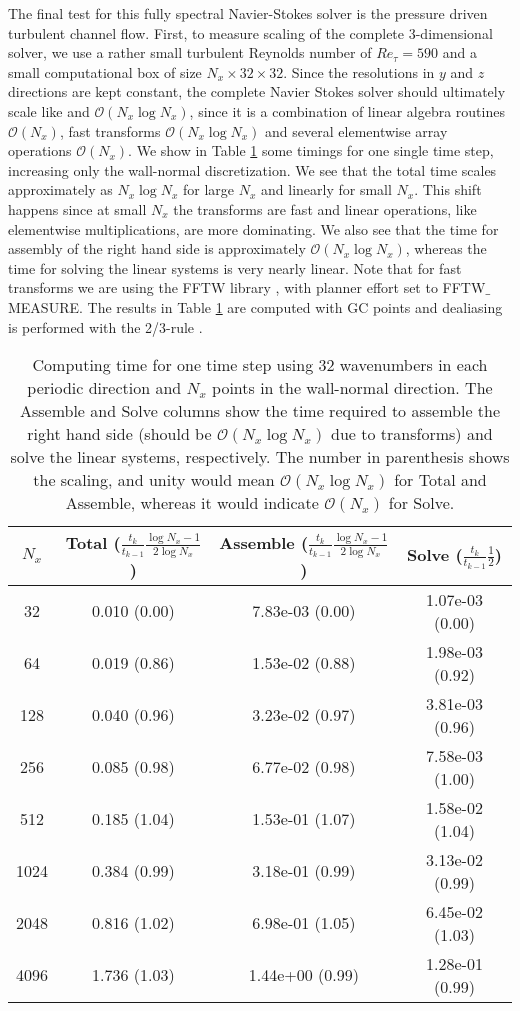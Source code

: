 \documentclass[preprint]{elsarticle}
\begin{document}
The final test for this fully spectral Navier-Stokes solver is the pressure driven turbulent channel flow. First, to measure scaling of the complete 3-dimensional solver, we use a rather small turbulent Reynolds number of $Re_{\tau}=590$ and a small computational box of size $N_x \times 32 \times 32$.  Since the resolutions in $y$ and $z$ directions are kept constant, the complete Navier Stokes solver should ultimately scale like and 
$\mathcal{O}(N_x\log N_x)$, since it is a combination of linear algebra routines 
$\mathcal{O}(N_x)$, fast transforms $\mathcal{O}(N_x \log N_x)$ and several elementwise array operations $\mathcal{O}(N_x)$. We show in Table \ref{tab:timings_solver} some timings for one single time 
step, increasing only the wall-normal discretization. We see that the total 
time scales approximately as $N_x \log N_x$ for large $N_x$ and linearly 
for small $N_x$. This shift happens since at small $N_x$ the transforms are fast and linear operations, like elementwise multiplications, are more dominating. 
We also see that the time for assembly of the right hand side is approximately 
$\mathcal{O}(N_x \log N_x)$, whereas the time for solving the linear systems is 
very nearly linear. Note that for fast transforms we are using 
the FFTW library \cite{libfftw}, with planner effort set to FFTW$\_$MEASURE. 
The results in Table \ref{tab:timings_solver} are computed with GC points and dealiasing is
performed with the 2/3-rule \cite{Orzag71}. 

\begin{table}
	\centering
	\caption{Computing time for one time step using 32 wavenumbers in each periodic direction and $N_x$ points in the wall-normal direction. The Assemble and Solve columns show the time required to assemble the right hand side (should be $\mathcal{O}(N_x \log N_x)$ due to transforms) and solve the linear systems, respectively. The number in parenthesis shows the scaling, and unity would mean $\mathcal{O}(N_x \log N_x)$ for Total and Assemble, whereas it would indicate $\mathcal{O}(N_x)$ for Solve. \label{tab:timings_solver}}
	\begin{tabular}{cccc}	
		$N_x$ & Total ($\frac{t_k }{t_{k-1}} \frac{\log N_x-1}{2 \log N_x}$) & Assemble ($\frac{t_k }{t_{k-1}} \frac{\log N_x-1}{2 \log N_x}$) & Solve ($\frac{t_k}{t_{k-1}} \frac{1}{2}$) \\ 
		\hline
		32 & 0.010 (0.00) & 7.83e-03 (0.00) & 1.07e-03 (0.00) \\ 
		64 & 0.019 (0.86) & 1.53e-02 (0.88) & 1.98e-03 (0.92) \\ 
		128 & 0.040 (0.96) & 3.23e-02 (0.97) & 3.81e-03 (0.96) \\ 
		256 & 0.085 (0.98) & 6.77e-02 (0.98) & 7.58e-03 (1.00) \\ 
		512 & 0.185 (1.04) & 1.53e-01 (1.07) & 1.58e-02 (1.04) \\ 
		1024 & 0.384 (0.99) & 3.18e-01 (0.99) & 3.13e-02 (0.99) \\ 
		2048 & 0.816 (1.02) & 6.98e-01 (1.05) & 6.45e-02 (1.03) \\ 
		4096 & 1.736 (1.03) & 1.44e+00 (0.99) & 1.28e-01 (0.99)
	\end{tabular}
\end{table}
\end{document}

